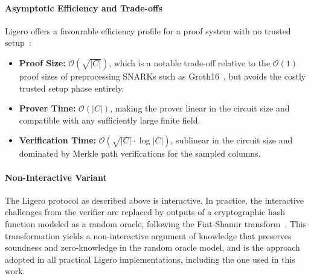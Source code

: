 \documentclass[binding=0.6cm,oneside,noexaminfo]{sapthesis}
\begin{document}
\paragraph{Asymptotic Efficiency and Trade-offs}
Ligero offers a favourable efficiency profile for a proof system with no trusted setup~\cite{Ames2017Ligero}:
\begin{itemize}
    \item \textbf{Proof Size:} $\mathcal{O}(\sqrt{|C|})$, which is a notable trade-off relative to the $\mathcal{O}(1)$ proof sizes of preprocessing SNARKs such as Groth16~\cite{cryptoeprint:2016/260}, but avoids the costly trusted setup phase entirely.
    \item \textbf{Prover Time:} $\mathcal{O}(|C|)$, making the prover linear in the circuit size and compatible with any sufficiently large finite field.
    \item \textbf{Verification Time:} $\mathcal{O}(\sqrt{|C|} \cdot \log |C|)$, sublinear in the circuit size and dominated by Merkle path verifications for the sampled columns.
\end{itemize}

\paragraph{Non-Interactive Variant}
The Ligero protocol as described above is interactive. 
In practice, the interactive challenges from the verifier are replaced by outputs of a cryptographic hash function modeled 
as a random oracle, following the Fiat-Shamir transform~\cite{FiatShamir1987}. This transformation yields a non-interactive 
argument of knowledge that preserves soundness and zero-knowledge in the random oracle model, and is the approach 
adopted in all practical Ligero implementations, including the one used in this work.
\end{document}
